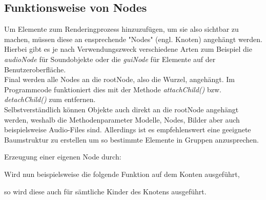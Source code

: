 \subsection{Funktionsweise von Nodes}
Um Elemente zum Renderingprozess hinzuzufügen, um sie also sichtbar zu machen, müssen diese an ensprechende "Nodes" (engl. Knoten) angehängt werden.
Hierbei gibt es je nach Verwendungszweck verschiedene Arten zum Beispiel die \emph{audioNode} für Soundobjekte oder die \emph{guiNode} für Elemente auf der Benutzeroberfläche.\\
Final werden alle Nodes an die rootNode, also die Wurzel, angehängt. Im  Programmcode funktioniert dies mit der Methode \emph{attachChild()} bzw. \emph{detachChild()} zum entfernen.\\
Selbstverständlich können Objekte auch direkt an die rootNode angehängt werden, weshalb die Methodenparameter Modelle, Nodes, Bilder aber auch beispielsweise Audio-Files sind.
Allerdings ist es empfehlenswert eine geeignete Baumstruktur zu erstellen um so bestimmte Elemente in Gruppen anzusprechen.\\

\colorbox{grau}{\parbox{\dimexpr\textwidth-8\fboxsep}{\centering
\underline{} Erzeugung einer eigenen Node durch:
\begin{center}
\end{center}

Wird nun beispielsweise die folgende Funktion auf dem Konten ausgeführt,
\begin{center}
\end{center}

so wird diese auch für sämtliche Kinder des Knotens ausgeführt.
}}

